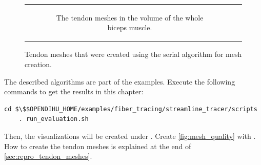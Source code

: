 \begin{figure}
\begin{tabular}{cc}
\begin{subfigure}[b]{0.30\textwidth}
      \caption{The tendon meshes in the volume of the whole biceps muscle.}%
      \label{fig:muscle_with_tendons}%
    \end{subfigure}
  \end{tabular}
  \caption{Tendon meshes that were created using the serial algorithm for mesh creation.}%
  \label{fig:tendon_meshes}%
\end{figure}%

\begin{reproduce}
  The described algorithms are part of the  examples. Execute the following commands to get the results in this chapter:
  \begin{lstlisting}[columns=fullflexible,breaklines=true,postbreak=\mbox{\textcolor{gray}{$\hookrightarrow$}\space}]
    cd $\$$OPENDIHU_HOME/examples/fiber_tracing/streamline_tracer/scripts
    . run_evaluation.sh
  \end{lstlisting}
  Then, the visualizations will be created under . Create \cref{fig:mesh_quality} with .
  How to create the tendon meshes is explained at the end of \cref{sec:repro_tendon_meshes}.
\end{reproduce}

